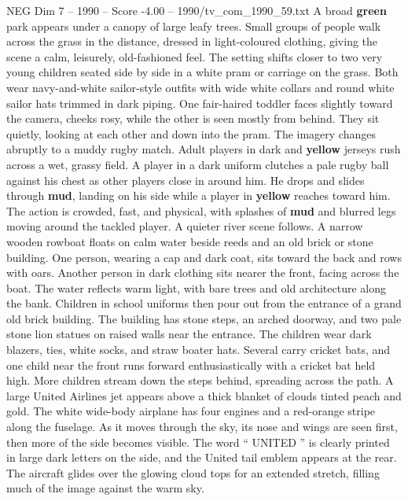 \begin{textsample}{NEG Dim 7 – 1990 – Score -4.00 – 1990/tv\_com\_1990\_59.txt}  \label{ex:f7_neg_035}
A broad \textbf{green} park appears under a canopy of large leafy trees.
Small groups of people walk across the grass in the distance, dressed in light-coloured clothing, giving the scene a calm, leisurely, old-fashioned feel.
The setting shifts closer to two very young children seated side by side in a white pram or carriage on the grass.
Both wear navy-and-white sailor-style outfits with wide white collars and round white sailor hats trimmed in dark piping.
One fair-haired toddler faces slightly toward the camera, cheeks rosy, while the other is seen mostly from behind.
They sit quietly, looking at each other and down into the pram.
The imagery changes abruptly to a muddy rugby match.
Adult players in dark and \textbf{yellow} jerseys rush across a wet, grassy field.
A player in a dark uniform clutches a pale rugby ball against his chest as other players close in around him.
He drops and slides through \textbf{mud}, landing on his side while a player in \textbf{yellow} reaches toward him.
The action is crowded, fast, and physical, with splashes of \textbf{mud} and blurred legs moving around the tackled player.
A quieter river scene follows.
A narrow wooden rowboat floats on calm water beside reeds and an old brick or stone building.
One person, wearing a cap and dark coat, sits toward the back and rows with oars.
Another person in dark clothing sits nearer the front, facing across the boat.
The water reflects warm light, with bare trees and old architecture along the bank.
Children in school uniforms then pour out from the entrance of a grand old brick building.
The building has stone steps, an arched doorway, and two pale stone lion statues on raised walls near the entrance.
The children wear dark blazers, ties, white socks, and straw boater hats.
Several carry cricket bats, and one child near the front runs forward enthusiastically with a cricket bat held high.
More children stream down the steps behind, spreading across the path.
A large United Airlines jet appears above a thick blanket of clouds tinted peach and gold.
The white wide-body airplane has four engines and a red-orange stripe along the fuselage.
As it moves through the sky, its nose and wings are seen first, then more of the side becomes visible.
The word “ UNITED ” is clearly printed in large dark letters on the side, and the United tail emblem appears at the rear.
The aircraft glides over the glowing cloud tops for an extended stretch, filling much of the image against the warm sky.

\end{textsample}
